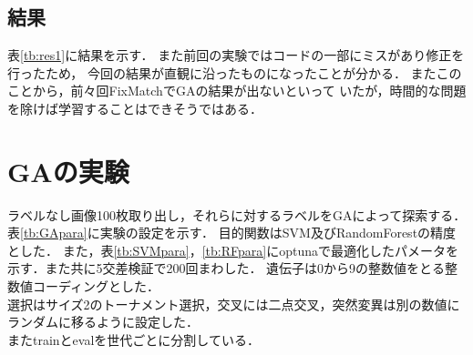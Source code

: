 \documentclass[twocolumn]{jarticle}     %
\begin{document}
\subsection{結果}
表\ref{tb:res1}に結果を示す．
また前回の実験ではコードの一部にミスがあり修正を行ったため，
今回の結果が直観に沿ったものになったことが分かる．
またこのことから，前々回FixMatchでGAの結果が出ないといって
いたが，時間的な問題を除けば学習することはできそうではある．

\begin{table}[h]
	\centering
	\caption{結果\label{tb:res1}}
\end{table}

\section{GAの実験}

ラベルなし画像100枚取り出し，それらに対するラベルをGAによって探索する．
表\ref{tb:GApara}に実験の設定を示す．
目的関数はSVM及びRandomForestの精度とした．
また，表\ref{tb:SVMpara}，\ref{tb:RFpara}にoptunaで最適化したパメータを示す．また共に5交差検証で200回まわした．
遺伝子は0から9の整数値をとる整数値コーディングとした．\\
選択はサイズ2のトーナメント選択，交叉には二点交叉，突然変異は別の数値にランダムに移るように設定した．\\
またtrainとevalを世代ごとに分割している．

\begin{table}[h]
	\centering
	\caption{GAの設定\label{tb:GApara}}
\end{table}
\end{document}
